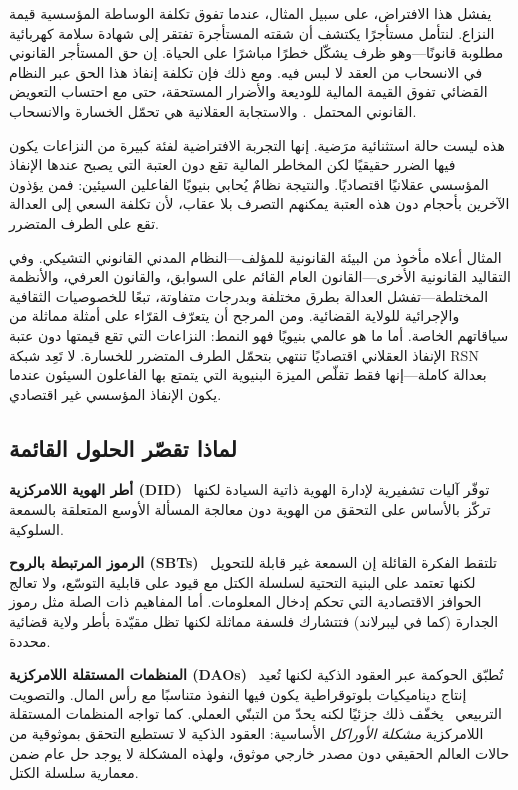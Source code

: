 \documentclass[11pt,a4paper,twocolumn]{article}
\begin{document}
يفشل هذا الافتراض، على سبيل المثال، عندما تفوق تكلفة الوساطة المؤسسية قيمة النزاع. لنتأمل مستأجرًا يكتشف أن شقته المستأجرة تفتقر إلى شهادة سلامة كهربائية مطلوبة قانونًا---وهو ظرف يشكّل خطرًا مباشرًا على الحياة. إن حق المستأجر القانوني في الانسحاب من العقد لا لبس فيه. ومع ذلك فإن تكلفة إنفاذ هذا الحق عبر النظام القضائي تفوق القيمة المالية للوديعة والأضرار المستحقة، حتى مع احتساب التعويض القانوني المحتمل~\cite{czcourtfees}. والاستجابة العقلانية هي تحمّل الخسارة والانسحاب.

هذه ليست حالة استثنائية مرَضية. إنها التجربة الافتراضية لفئة كبيرة من النزاعات يكون فيها الضرر حقيقيًا لكن المخاطر المالية تقع دون العتبة التي يصبح عندها الإنفاذ المؤسسي عقلانيًا اقتصاديًا. والنتيجة نظامٌ يُحابي بنيويًا الفاعلين السيئين: فمن يؤذون الآخرين بأحجام دون هذه العتبة يمكنهم التصرف بلا عقاب، لأن تكلفة السعي إلى العدالة تقع على الطرف المتضرر.

المثال أعلاه مأخوذ من البيئة القانونية للمؤلف---النظام المدني القانوني التشيكي. وفي التقاليد القانونية الأخرى---القانون العام القائم على السوابق، والقانون العرفي، والأنظمة المختلطة---تفشل العدالة بطرق مختلفة وبدرجات متفاوتة، تبعًا للخصوصيات الثقافية والإجرائية للولاية القضائية. ومن المرجح أن يتعرّف القرّاء على أمثلة مماثلة من سياقاتهم الخاصة. أما ما هو عالمي بنيويًا فهو النمط: النزاعات التي تقع قيمتها دون عتبة الإنفاذ العقلاني اقتصاديًا تنتهي بتحمّل الطرف المتضرر للخسارة. لا تَعِد شبكة RSN بعدالة كاملة---إنها فقط تقلّص الميزة البنيوية التي يتمتع بها الفاعلون السيئون عندما يكون الإنفاذ المؤسسي غير اقتصادي.

\subsection{لماذا تقصّر الحلول القائمة}

\textbf{أطر الهوية اللامركزية (DID)}~\cite{did2022} توفّر آليات تشفيرية لإدارة الهوية ذاتية السيادة لكنها تركّز بالأساس على التحقق من الهوية دون معالجة المسألة الأوسع المتعلقة بالسمعة السلوكية.

\textbf{الرموز المرتبطة بالروح (SBTs)}~\cite{weyl2022} تلتقط الفكرة القائلة إن السمعة غير قابلة للتحويل لكنها تعتمد على البنية التحتية لسلسلة الكتل مع قيود على قابلية التوسّع، ولا تعالج الحوافز الاقتصادية التي تحكم إدخال المعلومات. أما المفاهيم ذات الصلة مثل رموز الجدارة (كما في ليبرلاند) فتتشارك فلسفة مماثلة لكنها تظل مقيّدة بأطر ولاية قضائية محددة.

\textbf{المنظمات المستقلة اللامركزية (DAOs)}~\cite{buterin2014} تُطبّق الحوكمة عبر العقود الذكية لكنها تُعيد إنتاج ديناميكيات بلوتوقراطية يكون فيها النفوذ متناسبًا مع رأس المال. والتصويت التربيعي~\cite{buterin2019} يخفّف ذلك جزئيًا لكنه يحدّ من التبنّي العملي. كما تواجه المنظمات المستقلة اللامركزية \emph{مشكلة الأوراكل} الأساسية: العقود الذكية لا تستطيع التحقق بموثوقية من حالات العالم الحقيقي دون مصدر خارجي موثوق، ولهذه المشكلة لا يوجد حل عام ضمن معمارية سلسلة الكتل.
\end{document}
